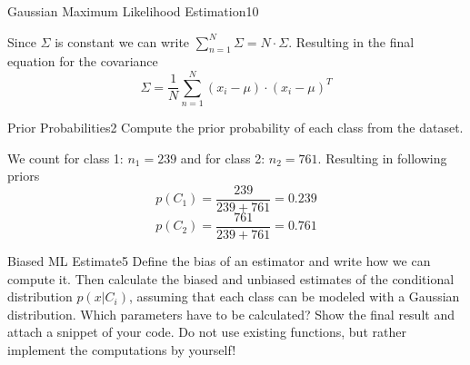 \begin{questions}
\begin{question}{Gaussian Maximum Likelihood Estimation}{10}
\begin{answer}
Since $\Sigma$ is constant we can write $\sum_{n=1}^{N}\Sigma = N\cdot\Sigma$.
Resulting in the final equation for the covariance
\begin{equation}
	\Sigma = \frac{1}{N} \sum_{n=1}^{N}(x_i -\mu)\cdot(x_i - \mu)^T
\end{equation}

\end{answer}

\end{question}


\begin{question}{Prior Probabilities}{2}
Compute the prior probability of each class from the dataset. 

\begin{answer}
We count for class 1: $n_1 = 239$ and for class 2: $n_2 = 761$. Resulting in following priors
\begin{equation}
	p(C_1) = \frac{239}{239+761} = 0.239
\end{equation}
\begin{equation}
    p(C_2) = \frac{761}{239+761} = 0.761
\end{equation}

\end{answer}

\end{question}



\begin{question}{Biased ML Estimate}{5}
Define the bias of an estimator and write how we can compute it.
Then calculate the biased and unbiased estimates of the conditional distribution $p(x|C_i)$, assuming that each class can be modeled with a Gaussian distribution. Which parameters have to be calculated?
Show the final result and attach a snippet of your code.
Do not use existing functions, but rather implement the computations by yourself!


\end{question}
\end{questions}
